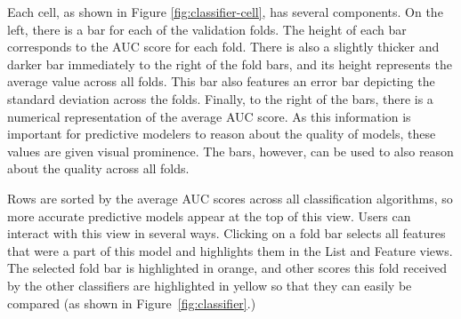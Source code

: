 Each cell, as shown in Figure \ref{fig:classifier-cell}, has several components.  On the left, there is a bar for each of the validation folds.  The height of each bar corresponds to the AUC score for each fold.  There is also a slightly thicker and darker bar immediately to the right of the fold bars, and its height represents the average value across all folds.  This bar also features an error bar depicting the standard deviation across the folds.  Finally, to the right of the bars, there is a numerical representation of the average AUC score.  As this information is important for predictive modelers to reason about the quality of models, these values are given visual prominence. The bars, however, can be used to also reason about the quality across all folds.


Rows are sorted by the average AUC scores across all classification algorithms, so more accurate predictive models appear at the top of this view.  Users can interact with this view in several ways.  Clicking on a fold bar selects all features that were a part of this model and highlights them in the List and Feature views.  The selected fold bar is highlighted in orange, and other scores this fold received by the other classifiers are highlighted in yellow so that they can easily be compared (as shown in Figure~\ref{fig:classifier}.)

